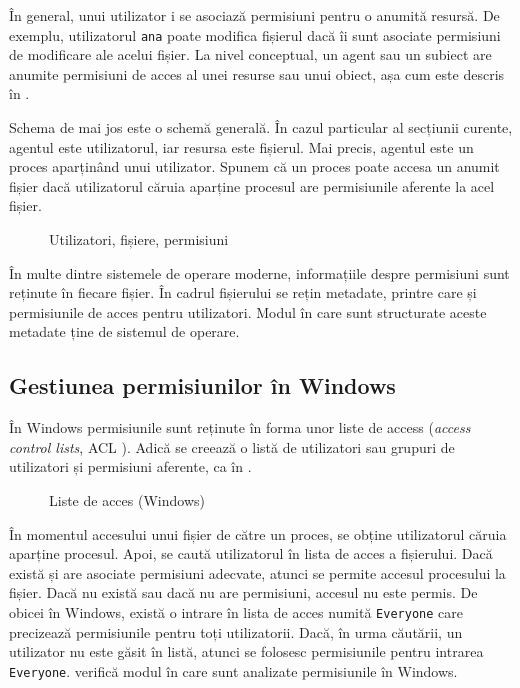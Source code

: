 În general, unui utilizator i se asociază permisiuni pentru o anumită resursă.
De exemplu, utilizatorul \texttt{ana} poate modifica fișierul  dacă îi sunt
asociate permisiuni de modificare ale acelui fișier. La nivel conceptual, un agent
sau un subiect are anumite permisiuni de acces al unei resurse sau unui obiect,
așa cum este descris în .

Schema de mai jos este o schemă generală. În cazul particular al secțiunii
curente, agentul este utilizatorul, iar resursa este fișierul. Mai precis,
agentul este un proces aparținând unui utilizator. Spunem că un proces poate
accesa un anumit fișier dacă utilizatorul căruia aparține procesul are
permisiunile aferente la acel fișier.

\begin{figure}[htbp]
	\centering
	\def\svgwidth{0.7\columnwidth}
	
        \caption{Utilizatori, fișiere, permisiuni}
        \label{fig:user:user-file-perm}
\end{figure}

În multe dintre sistemele de operare moderne, informațiile despre permisiuni sunt reținute în
fiecare fișier. În cadrul fișierului se rețin metadate, printre care și
permisiunile de acces pentru utilizatori. Modul în care sunt structurate aceste
metadate ține de sistemul de operare.

\subsection{Gestiunea permisiunilor în Windows}
\label{sec:user:windows-perm}

În Windows permisiunile sunt reținute în forma unor liste de access (\textit{access
control lists}, ACL ). Adică se creează o listă
de utilizatori sau grupuri de utilizatori și permisiuni aferente, ca în .

\begin{figure}[htbp]
	\centering
	\def\svgwidth{0.7\columnwidth}
	
        \caption{Liste de acces (Windows)}
	\label{fig:user:acl}
\end{figure}

În momentul accesului unui fișier de către un proces, se obține utilizatorul
căruia aparține procesul. Apoi, se caută utilizatorul în lista de acces a
fișierului. Dacă există și are asociate permisiuni adecvate, atunci se permite
accesul procesului la fișier. Dacă nu există sau dacă nu are permisiuni, accesul
nu este permis. De obicei în Windows, există o intrare în lista de acces numită
\texttt{Everyone} care precizează permisiunile pentru toți utilizatorii. Dacă, în urma
căutării, un utilizator nu este găsit în listă, atunci se folosesc permisiunile
pentru intrarea \texttt{Everyone}.  verifică modul în care sunt
analizate permisiunile în Windows.

